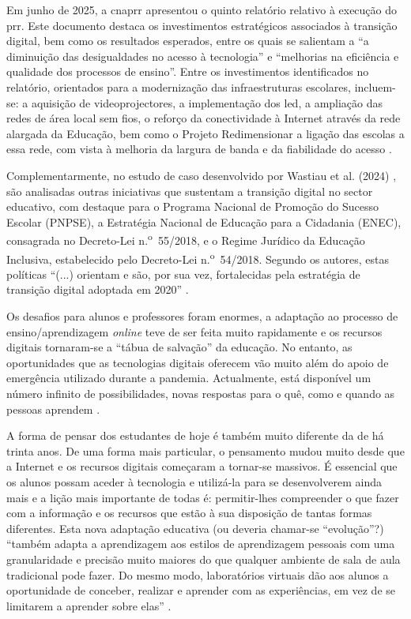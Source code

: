 Em junho de 2025, a \acrshort{cnaprr} apresentou o quinto relatório relativo à execução do \acrshort{prr}. Este documento destaca os investimentos estratégicos associados à transição digital, bem como os resultados esperados, entre os quais se salientam a ``a diminuição das desigualdades no acesso à tecnologia'' e ``melhorias na eficiência e qualidade dos processos de ensino''. Entre os investimentos identificados no relatório, orientados para a modernização das infraestruturas escolares, incluem-se: a aquisição de videoprojectores, a implementação dos \acrfull{led}, a ampliação das redes de área local sem fios, o reforço da conectividade à Internet através da rede alargada da Educação, bem como o Projeto Redimensionar a ligação das escolas a essa rede, com vista à melhoria da largura de banda e da fiabilidade do acesso \cite{cnaprr2025}.

Complementarmente, no estudo de caso desenvolvido por Wastiau et al. (2024) \cite{estrategiatransdigital}, são analisadas outras iniciativas que sustentam a transição digital no sector educativo, com destaque para o Programa Nacional de Promoção do Sucesso Escolar (PNPSE), a Estratégia Nacional de Educação para a Cidadania (ENEC), consagrada no Decreto-Lei n.\textsuperscript{o}~55/2018, e o Regime Jurídico da Educação Inclusiva, estabelecido pelo Decreto-Lei n.\textsuperscript{o}~54/2018. Segundo os autores, estas políticas ``(...) orientam e são, por sua vez, fortalecidas pela estratégia de transição digital adoptada em 2020'' \cite{estrategiatransdigital}.

Os desafios para alunos e professores foram enormes, a adaptação ao processo de ensino/aprendizagem \textit{online} teve de ser feita muito rapidamente e os recursos digitais tornaram-se a ``tábua de salvação'' da educação. No entanto, as oportunidades que as tecnologias digitais oferecem vão muito além do apoio de emergência utilizado durante a pandemia. Actualmente, está disponível um número infinito de possibilidades, novas respostas para o quê, como e quando as pessoas aprendem \cite{oecd_state_2021}.

A forma de pensar dos estudantes de hoje é também muito diferente da de há trinta anos. De uma forma mais particular, o pensamento mudou muito desde que a Internet e os recursos digitais começaram a tornar-se massivos. É essencial que os alunos possam aceder à tecnologia e utilizá-la para se desenvolverem ainda mais e a lição mais importante de todas é: permitir-lhes compreender o que fazer com a informação e os recursos que estão à sua disposição de tantas formas diferentes. Esta nova adaptação educativa (ou deveria chamar-se ``evolução''?) ``também adapta a aprendizagem aos estilos de aprendizagem pessoais com uma granularidade e precisão muito maiores do que qualquer ambiente de sala de aula tradicional pode fazer. Do mesmo modo, laboratórios virtuais dão aos alunos a oportunidade de conceber, realizar e aprender com as experiências, em vez de se limitarem a aprender sobre elas'' \cite{oecd_state_2021}.

